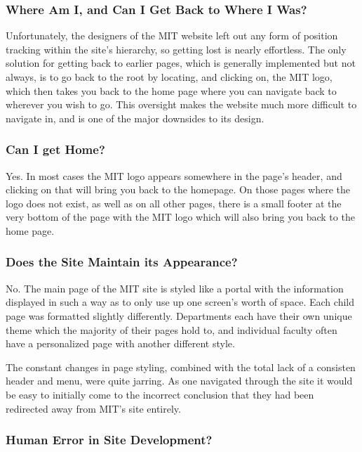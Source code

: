\subsubsection*{Where Am I, and Can I Get Back to Where I Was?}

Unfortunately, the designers of the MIT website left out any form of position tracking within
the site's hierarchy, so getting lost is nearly effortless. The only solution for getting back
to earlier pages, which is generally implemented but not always, is to go back to the root by
locating, and clicking on, the MIT logo, which then takes you back to the home page where you
can navigate back to wherever you wish to go. This oversight makes the website much more
difficult to navigate in, and is one of the major downsides to its design.

\subsubsection*{Can I get Home?}

Yes. In most cases the MIT logo appears somewhere in the page's header, and clicking on that
will bring you back to the homepage. On those pages where the logo does not exist, as well as
on all other pages, there is a small footer at the very bottom of the page with the MIT logo
which will also bring you back to the home page.

\subsubsection*{Does the Site Maintain its Appearance?}

No. The main page of the MIT site is styled like a portal with the information displayed in such a way as to
only use up one screen's worth of space. Each child page was formatted slightly differently.
Departments each have their own unique theme which the majority of their pages hold to, and
individual faculty often have a personalized page with another different style.

The constant changes in page styling, combined with the total lack of a consisten header and
menu, were quite jarring. As one navigated through the site it would be easy to initially
come to the incorrect conclusion that they had been redirected away from MIT's site entirely.

\subsubsection*{Human Error in Site Development?}

